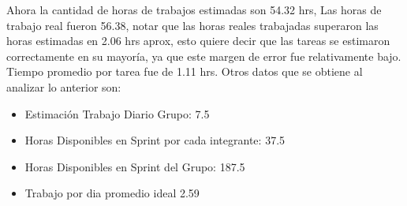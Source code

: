 \documentclass{memoria}
\begin{document}

Ahora la cantidad de horas de trabajos estimadas son 54.32 hrs, Las horas de trabajo real fueron 56.38, notar que las horas reales trabajadas superaron las horas estimadas en 2.06 hrs aprox, esto quiere decir que las tareas se estimaron correctamente en su mayoría, ya que este margen de error fue relativamente bajo. Tiempo promedio por tarea fue de 1.11 hrs. Otros datos que se obtiene al analizar lo anterior son:

\begin{itemize}
	\item Estimación Trabajo Diario Grupo: 7.5 
	\item Horas Disponibles en Sprint por cada integrante: 37.5 
	\item Horas Disponibles en Sprint del Grupo: 187.5 
	\item Trabajo por dia promedio ideal 2.59 
\end{itemize}
\end{document}
